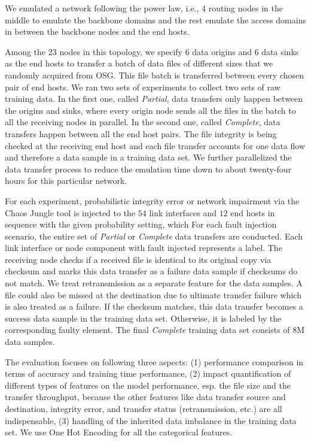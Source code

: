 We emulated a network following the power law, i.e., $4$ routing 
nodes in the middle to emulate the backbone domains and the rest emulate the access domains in between the backbone nodes and the end hosts. 

Among the $23$ nodes in this topology, we specify $6$ data origins and $6$ data sinks as the end hosts to transfer a batch of data files of different sizes that we randomly acquired from OSG. 
This file batch is transferred between every chosen pair of end hosts. We ran two sets of experiments to collect two sets of raw training data. In the first one, called {\it Partial},
data transfers only happen between the origins and sinks, where every origin node sends all the files in the batch 
to all the receiving nodes in parallel. In the second one, called {\it Complete}, data transfers happen between all the end host pairs. 
The file integrity is being checked at the receiving end host and each file transfer accounts for one data flow and therefore 
a data sample in a training data set. We further parallelized the data transfer process to reduce the emulation time down to about twenty-four hours for this particular network.  

For each experiment, probabilistic integrity error or network impairment via the Chaos Jungle tool is injected to the $54$ link interfaces and $12$ end hosts in sequence with the given probability setting, which 
For each fault injection scenario, the entire set of {\it Partial} or {\it Complete} data transfers are conducted. Each link interface or node component with fault injected represents a label.  
The receiving node checks if a received file is identical to its original copy via checksum and marks this data transfer as a failure data sample if checksums do not match. 
We treat retransmission as a separate feature for the data samples.  A file could also be missed at the destination due to ultimate transfer failure which is also treated as a failure. 
If the checksum matches, this data transfer becomes a success data sample in the training data set. Otherwise, it is labeled by the corresponding faulty element.
The final {\it Complete} training data set consists of 8{M} data samples.

The evaluation focuses on following three aspects: (1) performance comparison in terms of accuracy and training time performance, 
(2) impact quantification of different types of features on the model performance, esp. the file size and the transfer throughput, because the other features like data transfer source and destination, integrity error, 
and transfer status (retransmission, etc.) are all indispensable, (3) handling of the inherited data imbalance in the training data set.  We use One Hot Encoding for all the categorical features. 

